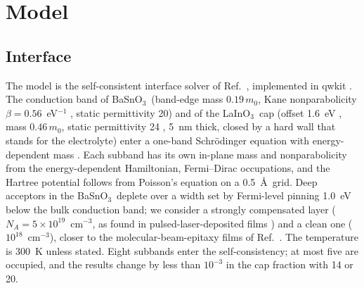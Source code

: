 \documentclass[11pt]{article}
\newcommand{\LIO}{\texorpdfstring{LaInO$_3$}{LaInO3}}
\newcommand{\BSO}{\texorpdfstring{BaSnO$_3$}{BaSnO3}}
\begin{document}
\section{Model}
\subsection{Interface}
The model is the self-consistent interface solver of Ref.~\cite{OwnbyMAT01}, implemented in qwkit \cite{qwkit}. The conduction band of \BSO\ (band-edge mass $0.19\,m_0$, Kane nonparabolicity $\beta=0.56$~eV$^{-1}$ \cite{Niedermeier2017}, static permittivity 20) and of the \LIO\ cap (offset 1.6~eV \cite{Kim2019LIO,Lee2024LIO,Aggoune2021}, mass $0.46\,m_0$, static permittivity 24 \cite{Jang2017LIO,Galazka2021}, 5~nm thick, closed by a hard wall that stands for the electrolyte) enter a one-band Schr\"odinger equation with energy-dependent mass \cite{Nelson1987}. Each subband has its own in-plane mass and nonparabolicity from the energy-dependent Hamiltonian, Fermi--Dirac occupations, and the Hartree potential follows from Poisson's equation on a 0.5~\AA\ grid. Deep acceptors in the \BSO\ deplete over a width set by Fermi-level pinning 1.0~eV below the bulk conduction band; we consider a strongly compensated layer ($N_A=5\times10^{19}$~cm$^{-3}$, as found in pulsed-laser-deposited films \cite{Kim2019LIO}) and a clean one ($10^{18}$~cm$^{-3}$), closer to the molecular-beam-epitaxy films of Ref.~\cite{Lee2024LIO}. The temperature is 300~K unless stated. Eight subbands enter the self-consistency; at most five are occupied, and the results change by less than $10^{-3}$ in the cap fraction with 14 or 20.
\end{document}
